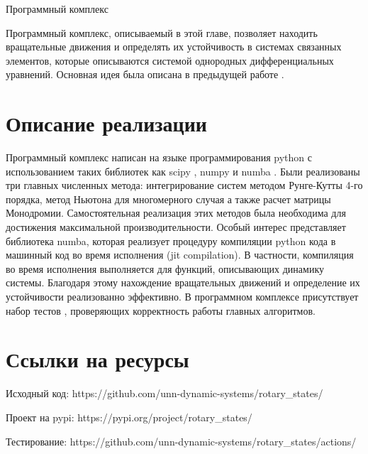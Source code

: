 \begin{chapter}{Программный комплекс}

	Программный комплекс, описываемый в этой главе, позволяет находить вращательные движения и
	определять их устойчивость в системах связанных элементов, которые описываются системой однородных
	дифференциальных уравнений. Основная идея была описана в предыдущей работе \cite{Khorkin}.

\section{Описание реализации}
Программный комплекс написан на языке программирования python с использованием таких
библиотек как scipy \cite{scipy}, numpy \cite{numpy} и numba \cite{numba}.
Были реализованы три главных численных метода: интегрирование систем методом Рунге-Кутты 4-го порядка, метод Ньютона для
многомерного случая а также расчет матрицы Монодромии. Самостоятельная реализация этих методов была необходима для достижения 
максимальной производительности. 
Особый интерес представляет библиотека numba, которая реализует процедуру 
компиляции python кода в машинный код во время исполнения (jit compilation).
В частности, компиляция во время исполнения выполняется для функций, описывающих динамику системы.
Благодаря этому нахождение вращательных движений и определение их устойчивости реализованно эффективно.
В программном комплексе присутствует набор тестов \cite{testing}, проверяющих корректность работы главных алгоритмов.





\section{Ссылки на ресурсы}
Исходный код: https://github.com/unn-dynamic-systems/rotary\_states/

Проект на pypi: https://pypi.org/project/rotary\_states/

Тестирование: https://github.com/unn-dynamic-systems/rotary\_states/actions/

\end{chapter}